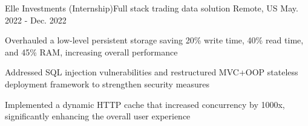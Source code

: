 \begin{cventries}
  \begin{comment}
  \cventry
    {Machine Learning \& Computation}
    {Chemical Molecular Energy Optimization}
    {Providence, RI}
    {Aug 2022 - Present}
    {
      \begin{cvitems}
        \item {Analyzed traditional Hartree-Fock and DFT methods with Gaussian}
        \item {Implemented the original data pipeline on Brown's Oscar super computing cluster with 200x speed}
        \item {Working on an efficient Belief Propagation network based on HMC}
      \end{cvitems}
    }
  \end{comment}

  \cventry
    {Elle Investments}
    {(Internship)Full stack trading data solution}
    {Remote, US}
    {May. 2022 - Dec. 2022}
    {
      \begin{cvitems}
          \item {Overhauled a low-level persistent storage saving 20\% write time, 40\% read time, and 45\% RAM, increasing overall performance}
          \item {Addressed SQL injection vulnerabilities and restructured MVC+OOP stateless deployment framework to strengthen security measures}
          \item {Implemented a dynamic HTTP cache that increased concurrency by 1000x, significantly enhancing the overall user experience}
      \end{cvitems}
    }

  \begin{comment}
  \cventry
    {The IBM Qiskit Quantum Computing}
    {(Research) Quantum machine learning lab}
    {Remote}
    {July 2021 - Aug. 2021}
    {
      \begin{cvitems}
        \item {Investigated practical applications of Quantum Approximate Optimization Algorithm, optimizing solutions for complex problems}
        \item {Conducted in-depth analysis of Quantum Boltzmann Machines, driving advancements in data generation and quantum computing}
      \end{cvitems}
    }
  \end{comment}


\end{cventries}
